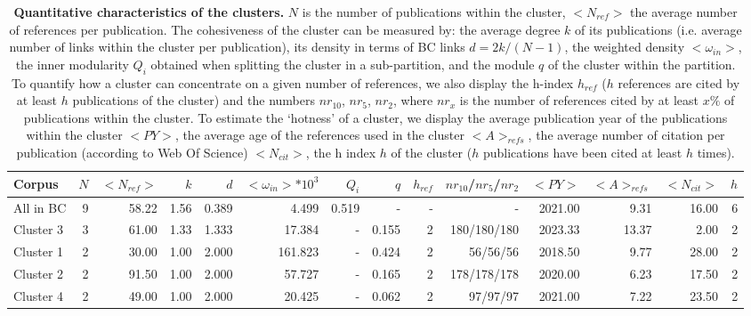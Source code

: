 \documentclass[a4paper,11pt]{report}
\begin{document}
\begin{landscape}
\begin{table}[ht]
\caption*{{\bf Quantitative characteristics of the clusters.} $N$ is the number of publications within the cluster, $<N_{ref}>$ the average number of references per publication. The cohesiveness of the cluster can be measured by: the average degree $k$ of its publications (i.e. average number of links within the cluster per publication), its density in terms of BC links $d=2k/(N-1)$, the weighted density $<\omega_{in}>$, the inner modularity $Q_i$ obtained when splitting the cluster in a sub-partition, and the module $q$ of the cluster within the partition. To quantify how a cluster can concentrate on a given number of references, we also display the h-index $h_{ref}$ ($h$ references are cited by at least $h$ publications of the cluster) and the numbers $nr_{10}$, $nr_{5}$, $nr_{2}$, where $nr_{x}$ is the number of references cited by at least $x\%$ of publications within the cluster. To estimate the `hotness' of a cluster, we display the average publication year of the publications within the cluster $<PY>$, the average age of the references used in the cluster $<A>_{refs}$, the average number of citation per publication (according to Web Of Science) $<N_{cit}>$, the h index $h$ of the cluster ($h$ publications have been cited at least $h$ times).}
\begin{center}
{
\scriptsize\begin{tabular}{|l |r r| r r r r r r r|r r r r|}
\hline
Corpus & $N$ & $<N_{ref}>$ & $k$ & $d$ & $<\omega_{in}>*10^3$ & $Q_i$ & $q$ & $h_{ref}$ & $nr_{10}$/$nr_{5}$/$nr_{2}$ & $<PY>$ & $<A>_{refs}$ & $<N_{cit}>$ & $h$ \\
\hline
All in BC & 9 & 58.22 & 1.56 & 0.389 & 4.499 & 0.519 & - & - & - & 2021.00 & 9.31 & 16.00 & 6\\
\hline
Cluster 3  & 3 & 61.00 & 1.33 & 1.333 & 17.384 & - & 0.155 & 2 & 180/180/180 & 2023.33 & 13.37 & 2.00 & 2\\
Cluster 1  & 2 & 30.00 & 1.00 & 2.000 & 161.823 & - & 0.424 & 2 & 56/56/56 & 2018.50 & 9.77 & 28.00 & 2\\
Cluster 2  & 2 & 91.50 & 1.00 & 2.000 & 57.727 & - & 0.165 & 2 & 178/178/178 & 2020.00 & 6.23 & 17.50 & 2\\
Cluster 4  & 2 & 49.00 & 1.00 & 2.000 & 20.425 & - & 0.062 & 2 & 97/97/97 & 2021.00 & 7.22 & 23.50 & 2\\
\hline
\end{tabular}}
\end{center}
\end{table}\clearpage


\end{landscape}
\end{document}
